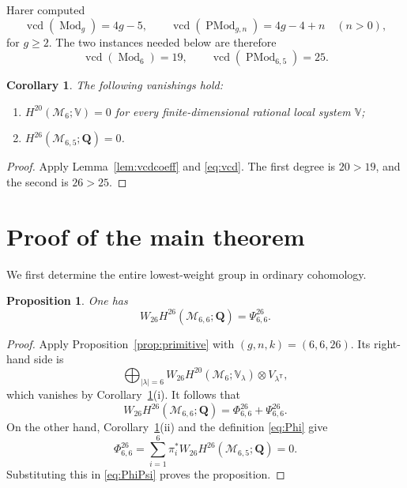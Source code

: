 \documentclass[11pt,reqno]{amsart}
\newcommand{\Q}{\mathbf{Q}}
\newcommand{\M}{\mathcal{M}}
\newcommand{\Mod}{\operatorname{Mod}}
\newcommand{\PMod}{\operatorname{PMod}}
\newcommand{\vcd}{\operatorname{vcd}}
\newtheorem{proposition}[theorem]{Proposition}
\newtheorem{corollary}[theorem]{Corollary}
\theoremstyle{definition}
\theoremstyle{remark}
\begin{document}
Harer computed \cite[Theorem~4.1]{HarerVCD}
\begin{equation}\label{eq:vcd}
 \vcd(\Mod_g)=4g-5,
 \qquad
 \vcd(\PMod_{g,n})=4g-4+n\quad(n>0),
\end{equation}
for $g\geq2$.  The two instances needed below are therefore
\[
  \vcd(\Mod_6)=19,
  \qquad
  \vcd(\PMod_{6,5})=25.
\]

\begin{corollary}\label{cor:vcdvanishing}
The following vanishings hold:
\begin{enumerate}[label=\textup{(\roman*)}]
\item $H^{20}(\M_6;\mathbb V)=0$ for every finite-dimensional rational local
  system $\mathbb V$;
\item $H^{26}(\M_{6,5};\Q)=0$.
\end{enumerate}
\end{corollary}

\begin{proof}
Apply Lemma~\ref{lem:vcdcoeff} and \eqref{eq:vcd}.  The first degree is
$20>19$, and the second is $26>25$.
\end{proof}

\section{Proof of the main theorem}

We first determine the entire lowest-weight group in ordinary cohomology.

\begin{proposition}\label{prop:psi}
One has
\[
  W_{26}H^{26}(\M_{6,6};\Q)=\Psi^{26}_{6,6}.
\]
\end{proposition}

\begin{proof}
Apply Proposition~\ref{prop:primitive} with $(g,n,k)=(6,6,26)$.  Its
right-hand side is
\[
  \bigoplus_{|\lambda|=6}
  W_{26}H^{20}(\M_6;\mathbb V_\lambda)
  \otimes V_{\lambda^{\mathsf T}},
\]
which vanishes by Corollary~\ref{cor:vcdvanishing}(i).  It follows that
\begin{equation}\label{eq:PhiPsi}
  W_{26}H^{26}(\M_{6,6};\Q)
  =\Phi^{26}_{6,6}+\Psi^{26}_{6,6}.
\end{equation}
On the other hand, Corollary~\ref{cor:vcdvanishing}(ii) and the definition
\eqref{eq:Phi} give
\[
  \Phi^{26}_{6,6}
  =\sum_{i=1}^6\pi_i^*W_{26}H^{26}(\M_{6,5};\Q)=0.
\]
Substituting this in \eqref{eq:PhiPsi} proves the proposition.
\end{proof}
\end{document}

